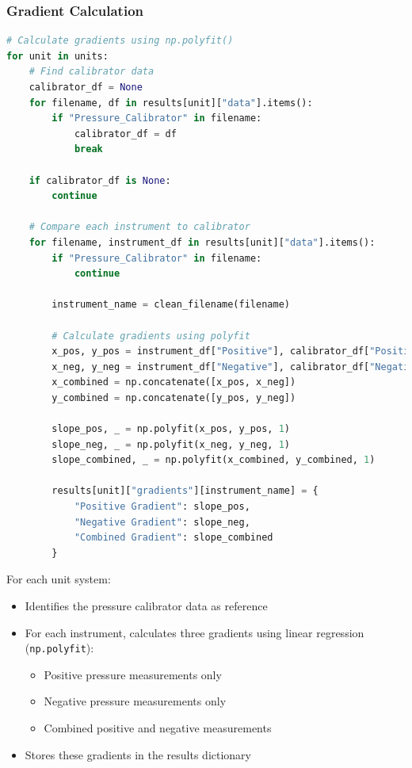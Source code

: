 \documentclass{article}
\begin{document}
\subsubsection{Gradient Calculation}
\begin{lstlisting}[language=Python,escapechar=@]
# Calculate gradients using np.polyfit()
for unit in units:
	# Find calibrator data
	calibrator_df = None
	for filename, df in results[unit]["data"].items():
		if "Pressure_Calibrator" in filename:
			calibrator_df = df
			break

	if calibrator_df is None:
		continue

	# Compare each instrument to calibrator
	for filename, instrument_df in results[unit]["data"].items():
		if "Pressure_Calibrator" in filename:
			continue
	
		instrument_name = clean_filename(filename)

		# Calculate gradients using polyfit
		x_pos, y_pos = instrument_df["Positive"], calibrator_df["Positive"]
		x_neg, y_neg = instrument_df["Negative"], calibrator_df["Negative"]
		x_combined = np.concatenate([x_pos, x_neg])
		y_combined = np.concatenate([y_pos, y_neg])
		
		slope_pos, _ = np.polyfit(x_pos, y_pos, 1)
		slope_neg, _ = np.polyfit(x_neg, y_neg, 1)
		slope_combined, _ = np.polyfit(x_combined, y_combined, 1)
		
		results[unit]["gradients"][instrument_name] = {
			"Positive Gradient": slope_pos,
			"Negative Gradient": slope_neg,
			"Combined Gradient": slope_combined
		}
\end{lstlisting}

For each unit system:
\begin{itemize}
	\item Identifies the pressure calibrator data as reference
	\item For each instrument, calculates three gradients using linear regression (\texttt{np.polyfit}):
	\begin{itemize}
		\item Positive pressure measurements only
		\item Negative pressure measurements only
		\item Combined positive and negative measurements
	\end{itemize}
	\item Stores these gradients in the results dictionary
\end{itemize}
\end{document}
